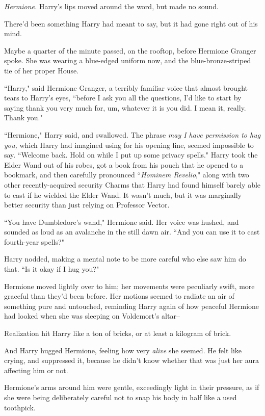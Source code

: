 \emph{Hermione.} Harry's lips moved around the word, but made no sound.

There'd been something Harry had meant to say, but it had gone right out of his mind.

Maybe a quarter of the minute passed, on the rooftop, before Hermione Granger spoke. She was wearing a blue-edged uniform now, and the blue-bronze-striped tie of her proper House.

``Harry," said Hermione Granger, a terribly familiar voice that almost brought tears to Harry's eyes, ``before I ask you all the questions, I'd like to start by saying thank you very much for, um, whatever it is you did. I mean it, really. Thank you."

``Hermione," Harry said, and swallowed. The phrase \emph{may I have permission to hug you,} which Harry had imagined using for his opening line, seemed impossible to say. ``Welcome back. Hold on while I put up some privacy spells." Harry took the Elder Wand out of his robes, got a book from his pouch that he opened to a bookmark, and then carefully pronounced ``\emph{Hominem Revelio}," along with two other recently-acquired security Charms that Harry had found himself barely able to cast if he wielded the Elder Wand. It wasn't much, but it was marginally better security than just relying on Professor Vector.

``You have Dumbledore's wand," Hermione said. Her voice was hushed, and sounded as loud as an avalanche in the still dawn air. ``And you can use it to cast fourth-year spells?"

Harry nodded, making a mental note to be more careful who else saw him do that. ``Is it okay if I hug you?"

Hermione moved lightly over to him; her movements were peculiarly swift, more graceful than they'd been before. Her motions seemed to radiate an air of something pure and untouched, reminding Harry again of how peaceful Hermione had looked when she was sleeping on Voldemort's altar\---

Realization hit Harry like a ton of bricks, or at least a kilogram of brick.

And Harry hugged Hermione, feeling how very \emph{alive} she seemed. He felt like crying, and suppressed it, because he didn't know whether that was just her aura affecting him or not.

Hermione's arms around him were gentle, exceedingly light in their pressure, as if she were being deliberately careful not to snap his body in half like a used toothpick.

